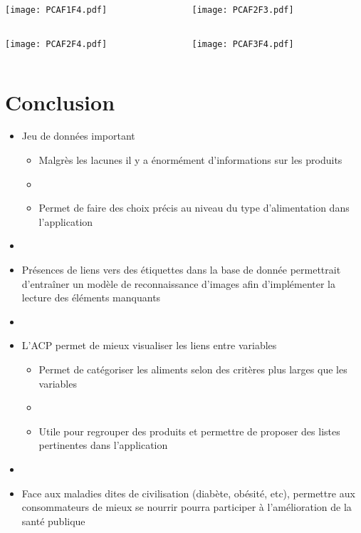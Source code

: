 \begin{frame}
  \begin{columns}
    \begin{column}{.5\textwidth}
      \texttt{[image: PCAF1F4.pdf]}
    \end{column}
    \begin{column}{.5\textwidth}
      \texttt{[image: PCAF2F3.pdf]}
    \end{column}
  \end{columns}
\end{frame}

\begin{frame}
  \begin{columns}
    \begin{column}{.5\textwidth}
      \texttt{[image: PCAF2F4.pdf]}
    \end{column}
    \begin{column}{.5\textwidth}
      \texttt{[image: PCAF3F4.pdf]}
    \end{column}
  \end{columns}
\end{frame}

\section{Conclusion}
\begin{frame}
  \begin{itemize}
    \item Jeu de données important
    \begin{itemize}
      \item Malgrès les lacunes il y a énormément d'informations sur les produits
      \item[]
      \item Permet de faire des choix précis au niveau du type d'alimentation dans l'application
    \end{itemize}
    \item[]
    \item Présences de liens vers des étiquettes dans la base de donnée permettrait d'entraîner un modèle de reconnaissance
    d'images afin d'implémenter la lecture des éléments manquants 
    \item[]
    \item L'ACP permet de mieux visualiser les liens entre variables
          \begin{itemize}
            \item Permet de catégoriser les aliments selon des critères plus larges que les variables
            \item[]
            \item Utile pour regrouper des produits et permettre de proposer des listes pertinentes dans l'application
          \end{itemize}
    \item[]
    \item Face aux maladies dites de civilisation (diabète, obésité, etc), permettre aux consommateurs
          de mieux se nourrir pourra participer à l'amélioration de la santé publique
  \end{itemize}
\end{frame}

